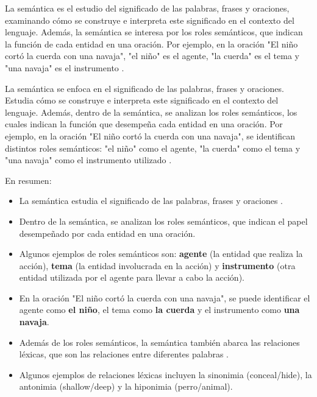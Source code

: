 \documentclass{book}
\begin{document}
La semántica es el estudio del significado de las palabras, frases y oraciones, examinando cómo se construye e interpreta este significado en el contexto del lenguaje. Además, la semántica se interesa por los roles semánticos, que indican la función de cada entidad en una oración. Por ejemplo, en la oración "El niño cortó la cuerda con una navaja", "el niño" es el agente, "la cuerda" es el tema y "una navaja" es el instrumento \cite{JohnsonMLSS}.

La semántica se enfoca en el significado de las palabras, frases y oraciones. Estudia cómo se construye e interpreta este significado en el contexto del lenguaje. Además, dentro de la semántica, se analizan los roles semánticos, los cuales indican la función que desempeña cada entidad en una oración. Por ejemplo, en la oración "El niño cortó la cuerda con una navaja", se identifican distintos roles semánticos: "el niño" como el agente, "la cuerda" como el tema y "una navaja" como el instrumento utilizado \cite{JohnsonMLSS}.


En resumen:
\begin{itemize}
\item La semántica estudia el significado de las palabras, frases y oraciones \cite{JohnsonMLSS}.
\item Dentro de la semántica, se analizan los roles semánticos, que indican el papel desempeñado por cada entidad en una oración.
\item Algunos ejemplos de roles semánticos son: \textcolor[rgb]{0.00,0.00,1.00}{\textbf{agente}} (la entidad que realiza la acción), \textcolor[rgb]{1.00,0.00,0.00}{\textbf{tema}} (la entidad involucrada en la acción) y \textcolor[rgb]{0.00,1.00,0.00}{\textbf{instrumento}} (otra entidad utilizada por el agente para llevar a cabo la acción).
\item En la oración "El niño cortó la cuerda con una navaja", se puede identificar el agente como \textcolor[rgb]{0.00,0.00,1.00}{\textbf{el niño}}, el tema como \textcolor[rgb]{1.00,0.00,0.00}{\textbf{la cuerda}} y el instrumento como \textcolor[rgb]{0.00,1.00,0.00}{\textbf{una navaja}}.
\item Además de los roles semánticos, la semántica también abarca las relaciones léxicas, que son las relaciones entre diferentes palabras \cite{yule2016study}.
\item Algunos ejemplos de relaciones léxicas incluyen la sinonimia (conceal/hide), la antonimia (shallow/deep) y la hiponimia (perro/animal).
\end{itemize}
\end{document}
